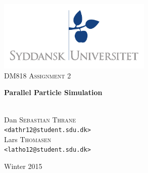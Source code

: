 \documentclass[a4paper,11pt,oneside]{book}
\title{}
\author{}
\date{}
\begin{document}
\begin{titlepage}
\begin{center}

\thispagestyle{empty}
\includegraphics[width=0.55\textwidth]{logo.pdf}\\[1cm]    
\textsc{\Large DM818 Assignment 2}\\[0.5cm]

\begin{Huge}
\textbf{Parallel Particle Simulation}
\end{Huge}

\vspace{4cm}

\begin{minipage}{1\textwidth}
\begin{center}
\emph{}\\

Dan \textsc{Sebastian Thrane}\\
\verb!<dathr12@student.sdu.dk>!\\

Lars \textsc{Thomasen}\\
\verb!<latho12@student.sdu.dk>!\\

\end{center}
\end{minipage}
\begin{minipage}{0.4\textwidth}
\end{minipage}

\vfill

{\large Winter 2015}\\

\end{center}
\end{titlepage}

\renewcommand{\contentsname}{Table of Contents}
\tableofcontents
\thispagestyle{empty}
\end{document}

